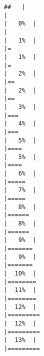 \documentclass[
]{book}
\begin{document}
\begin{verbatim}
##   |                                                                              |                                                                      |   0%  |                                                                              |                                                                      |   1%  |                                                                              |=                                                                     |   1%  |                                                                              |=                                                                     |   2%  |                                                                              |==                                                                    |   2%  |                                                                              |==                                                                    |   3%  |                                                                              |===                                                                   |   4%  |                                                                              |===                                                                   |   5%  |                                                                              |====                                                                  |   5%  |                                                                              |====                                                                  |   6%  |                                                                              |=====                                                                 |   7%  |                                                                              |=====                                                                 |   8%  |                                                                              |======                                                                |   8%  |                                                                              |======                                                                |   9%  |                                                                              |=======                                                               |   9%  |                                                                              |=======                                                               |  10%  |                                                                              |========                                                              |  11%  |                                                                              |========                                                              |  12%  |                                                                              |=========                                                             |  12%  |                                                                              |=========                                                             |  13%  |                                                                              |========= 
\end{verbatim}
\end{document}
